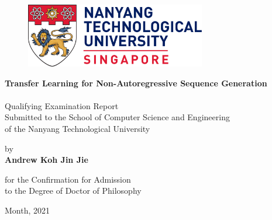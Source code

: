

\begin{titlepage}
\begin{center}
\begin{doublespacing}

       \begin{figure}
       \centering
       \includegraphics[width=0.7\textwidth]{images/Nanyang_Technological_University.png}
       \end{figure}
       
       
       \vspace*{5mm}
       \LARGE{\textbf{Transfer Learning for Non-Autoregressive Sequence Generation\\}}
       {\large{\\Qualifying Examination Report\\
        Submitted to the School of Computer Science and Engineering\\
        of the Nanyang Technological University
        }}

       \vspace{15mm}
       \large{by}\\
       
       \vspace{15mm}
       {\Large\textbf{Andrew Koh Jin Jie}}

       \vspace{20mm}

       {\large{for the Confirmation for Admission \\
        to the Degree of Doctor of Philosophy}\\}

       \vfill
       \large{Month, 2021}
       
\end{doublespacing}
\end{center}
\end{titlepage}
